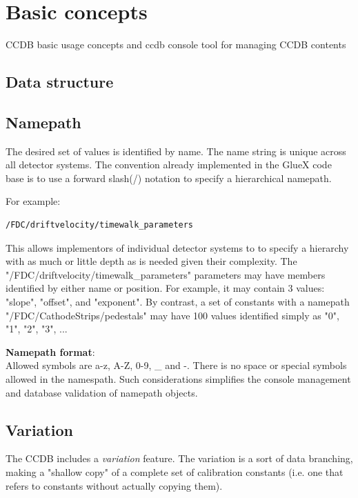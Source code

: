 \documentclass{article}
\begin{document}
\newpage
\section{Basic concepts}\label{sec:basic_concepts}

CCDB basic usage concepts and ccdb console tool for managing CCDB contents


\subsection{Data structure}


\subsection{Namepath}
The desired set of values is identified by name. The name string is unique
across all detector systems. The convention already implemented in the GlueX
code base is to use a forward slash(/) notation to specify a hierarchical
namepath.

For example:
\begin{verbatim}
/FDC/driftvelocity/timewalk_parameters
\end{verbatim}

This allows implementors of individual detector systems to to specify a
hierarchy with as much or little depth as is needed given their complexity.
The "/FDC/driftvelocity/timewalk\_parameters" parameters may have members
identified by either name or position. For example, it may contain 3 values:
"slope", "offset", and "exponent". By contrast, a set of constants with a
namepath "/FDC/CathodeStrips/pedestals" may have 100 values identified simply
as "0", "1", "2", "3", ...

\textbf{Namepath format}:\\
Allowed symbols are a-z, A-Z, 0-9, \_ and -. There is no space or special symbols
allowed in the namespath. Such considerations simplifies the console management
and database validation of namepath objects.


\subsection{Variation}
The CCDB includes a \textit{variation} feature. The variation is a sort
of data branching, making a "shallow copy" of a complete set of calibration
constants (i.e. one that refers to constants without actually copying them).
\end{document}

